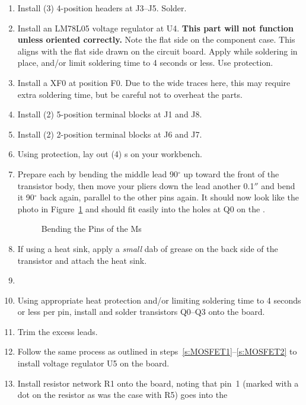 \documentclass[letterpaper,twoside,onecolumn,openright,final]{memoir}
\begin{document}
\begin{enumerate}
\item	Install (3) 4-position  headers at J3--J5.  Solder.
\item	Install an LM78L05 voltage regulator at U4.  
	{\bfseries This part will not function unless oriented correctly.}  Note the flat side on
	the component case.  This aligns with the flat side drawn on the circuit board.
	Apply  while soldering in
	place, and/or limit soldering time to 4 seconds or less.  Use  protection.
\item	Install a  XF0 at position F0.  Due to the wide  traces here, this may require
	extra soldering time, but be careful not to overheat the parts.
\item
	Install (2) 5-position terminal blocks at J1 and J8.  
\item
	Install (2) 2-position terminal blocks at J6 and J7.  
\item\label{s:MOSFET1}
	Using  protection, lay out (4) s on your workbench.
\item	Prepare each  by bending the middle lead 90$^\circ$ up toward the front
	of the transistor body, then move your pliers down the lead another 0.1$''$ and bend it
	90$^\circ$
	back again, parallel to the other pins again.  It should now look like the photo
	in Figure~\ref{fig:mosfet} and should fit
	easily into the holes at Q0 on the .
\begin{figure}
	\centerline{ }
	\caption{Bending the Pins of the Ms\label{fig:mosfet}}
\end{figure}
\item	If using a heat sink, apply a \emph{small} dab of  grease on the back side of the transistor and attach the heat sink.
\item
\item	Using appropriate heat protection and/or limiting soldering time to 4 seconds or less per
	pin, install and solder transistors Q0--Q3 onto the board.
\item\label{s:MOSFET2}
	Trim the excess leads.
\item
	Follow the same process as outlined in steps~\ref{s:MOSFET1}--\ref{s:MOSFET2}
	to install voltage regulator U5 on the board.
\item
	Install resistor network R1 onto the board, noting that pin~1 (marked
	with a dot on the resistor as was the case with R5) goes into the

\end{enumerate}
\end{document}
